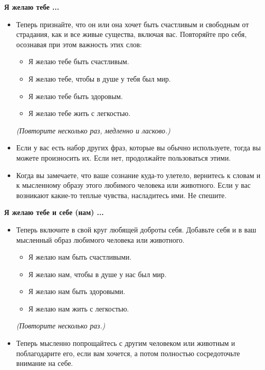 \vspace{3ex}

{\large \textbf{Я желаю тебе ...}}
\begin{itemize}
	\item Теперь признайте, что он или она хочет быть счастливым и свободным от страдания, как и все живые существа, включая вас. Повторяйте про себя, осознавая при этом важность этих слов:
	\begin{itemize}
		\item Я желаю тебе быть счастливым.
		\item Я желаю тебе, чтобы в душе у тебя был мир.
		\item Я желаю тебе быть здоровым.
		\item Я желаю тебе жить с легкостью.
	\end{itemize}
	\emph{(Повторите несколько раз, медленно и ласково.)}
	\item Если у вас есть набор других фраз, которые вы обычно используете, тогда вы можете произносить их. Если нет, продолжайте пользоваться этими.
	\item Когда вы замечаете, что ваше сознание куда-то улетело, вернитесь к словам и к мысленному образу этого любимого человека или животного. Если у вас возникают какие-то теплые чувства, насладитесь ими. Не спешите.
\end{itemize}

\vspace{3ex}

{\large \textbf{Я желаю тебе и себе (нам) ...}}
\begin{itemize}
	\item Теперь включите в свой круг любящей доброты себя. Добавьте себя и в ваш мысленный образ любимого человека или животного.
	\begin{itemize}
		\item Я желаю нам быть счастливыми.
		\item Я желаю нам, чтобы в душе у нас был мир.
		\item Я желаю нам быть здоровыми.
		\item Я желаю нам жить с легкостью.
	\end{itemize}
	\emph{(Повторите несколько раз.)}
	\item Теперь мысленно попрощайтесь с другим человеком или животным и поблагодарите его, если вам хочется, а потом полностью сосредоточьте внимание на себе.
\end{itemize}

\vspace{3ex}

